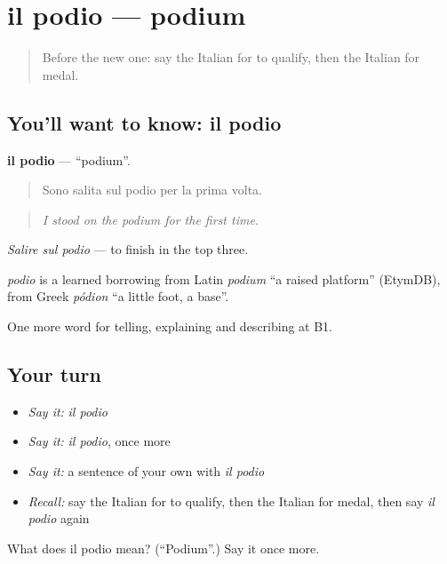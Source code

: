 \section[il podio]{il podio — podium}

\label{lesson:IT-C512-podio}



\begin{quote}
Before the new one: say the Italian for to qualify, then the Italian for medal.
\end{quote}

\subsection*{You'll want to know: il podio}
\textbf{il podio} — \textquotedblleft{}podium\textquotedblright{}.

\begin{quote}
Sono salita sul podio per la prima volta.
\end{quote}

\begin{quote}
\emph{I stood on the podium for the first time.}
\end{quote}

\emph{Salire sul podio} — to finish in the top three.

\begin{cousinweb}
\emph{podio} is a learned borrowing from Latin \emph{podium} \textquotedblleft{}a raised platform\textquotedblright{} (EtymDB), from Greek \emph{pódion} \textquotedblleft{}a little foot, a base\textquotedblright{}.
\end{cousinweb}

\begin{grammarlens}[title={What you've built}]
One more word for telling, explaining and describing at B1.
\end{grammarlens}

\subsection*{Your turn}
\begin{itemize}
\raggedright
  \item \emph{Say it:} \emph{il podio}
  \item \emph{Say it:} \emph{il podio}, once more
  \item \emph{Say it:} a sentence of your own with \emph{il podio}
  \item \emph{Recall:} say the Italian for to qualify, then the Italian for medal, then say \emph{il podio} again
\end{itemize}

\begin{tcolorbox}[breakable,colback=teal!4,colframe=teal!35!black,title={Before you move on}]
What does il podio mean? (\textquotedblleft{}Podium\textquotedblright{}.) Say it once more.
\end{tcolorbox}
